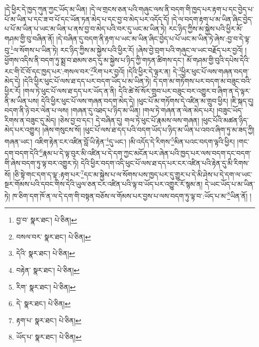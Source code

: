 །དེ་ཕྱིར་དེ་ཁྱད་ཀུན་ཀྱང་ཡོད་མ་ཡིན། །དེ་ལ་གྲངས་ཅན་པའི་གཞུང་ལས་ནི་བདག་གི་ཁྱད་པར་རྟག་པ་དང་བྱེད་པ་པོ་མ་ཡིན་པ་དང་ཟ་བ་པོ་དང་ཡོན་ཏན་མེད་པ་དང་བྱ་བ་མེད་པར་འདོད་དོ། །དེ་ལ་བདག་རྟག་པ་མ་ཡིན་ཞིང་བྱེད་པ་པོ་མ་ཡིན་པ་ཡང་མ་ཡིན་པ་ནས་བྱ་བ་མེད་པའི་བར་དུ་ཡང་མ་ཡིན་ཏེ། རང་ཉིད་ཀྱིས་མ་སྐྱེས་པའི་ཕྱིར་མོ་གཤམ་གྱི་བུ་བཞིན་ནོ། །དེ་བཞིན་དུ་བདག་ནི་རྟག་པ་ཡང་མ་ཡིན་ཞིང་བྱེད་པ་པོ་ཡང་མ་ཡིན་ཏེ་ཞེས་:བྱ་བ་དེ་ལྟ་བུ་\footnote{བྱ་བ་  སྣར་ཐང་།  པེ་ཅིན། }ལ་སོགས་པ་ཡིན་ཏེ། རང་ཉིད་ཀྱིས་མ་སྐྱེས་པའི་ཕྱིར་རོ། །ཞེས་བྱེ་བྲག་པའི་གཞུང་ལ་ཡང་བརྗོད་པར་བྱའོ། །ཕྱོགས་འདིས་ནི་བདག་ཏུ་སྨྲ་བ་ཐམས་ཅད་དུ་མ་སྐྱེས་པ་ཉིད་ཀྱི་གཏན་ཚིགས་དང་། མོ་གཤམ་གྱི་བུའི་དཔེས་དེའི་རང་གི་ངོ་བོ་དང་ཁྱད་པར་:གསལ་བར་\footnote{བསལ་བར་  སྣར་ཐང་།  པེ་ཅིན། }རིག་པར་བྱའོ། །དེའི་ཕྱིར་དེ་ལྟར་ན། དེ་\footnote{དེའི་  སྣར་ཐང་།  པེ་ཅིན། }ཕྱིར་ཕུང་པོ་ལས་གཞན་བདག་མེད་དེ། །དེའི་ཕྱིར་ཕུང་པོ་ལས་ཐ་དད་པར་བདག་ཡོད་པ་མ་ཡིན་ཏེ། དེ་དག་མ་གཏོགས་པར་བདག་མ་བཟུང་བའི་ཕྱིར་རོ། །གལ་ཏེ་ཕུང་པོ་ལས་ཐ་དད་པར་ཡོད་ན་ནི། དེའི་ཚེ་སོ་སོར་གྲུབ་པར་བཟུང་བར་འགྱུར་བ་ཞིག་ན་དེ་ལྟར་ནི་མ་ཡིན་པས། དེའི་ཕྱིར་ཕུང་པོ་ལས་གཞན་བདག་མེད་དེ། །ཕུང་པོ་མ་གཏོགས་དེ་འཛིན་མ་གྲུབ་ཕྱིར། །ཇི་སྐད་དུ། བདག་ནི་ཉེ་བར་ལེན་པ་ལས། །གཞན་དུ་འཐད་པ་ཉིད་མ་ཡིན། །གལ་ཏེ་གཞན་ན་ལེན་མེད་པར། །བཟུང་ཡོད་རིགས་ན་བཟུང་དུ་མེད། །ཅེས་བྱ་བ་དང་། དེ་བཞིན་དུ། གལ་ཏེ་ཕུང་པོ་རྣམས་ལས་གཞན། །ཕུང་པོའི་མཚན་ཉིད་མེད་པར་འགྱུར། །ཞེས་གསུངས་སོ། །ཕུང་པོ་ལས་ཐ་དད་པའི་བདག་ཡོད་པ་ཉིད་མ་ཡིན་པ་འབའ་ཞིག་ཏུ་མ་ཟད་ཀྱི། གཞན་ཡང་། འཇིག་རྟེན་ངར་འཛིན་བློ་ཡི་རྟེན་\footnote{བརྟེན་  སྣར་ཐང་།  པེ་ཅིན། }དུ་ཡང་། །མི་འདོད་དེ་རིགས་\footnote{རིག་  སྣར་ཐང་།  པེ་ཅིན། }མིན་པའང་བདག་ལྟའི་ཕྱིར། །གང་དག་བདག་དེའི་\footnote{དེ་  སྣར་ཐང་།  པེ་ཅིན། }རྣམ་པ་དེ་ལྟ་བུར་མི་འཛིན་པ་དེ་དག་ཀྱང་མངོན་པར་ཞེན་པའི་ཁྱད་པར་ལས་བདག་དང་བདག་གི་ཞེས་བདག་ཏུ་ལྟ་བར་འགྱུར་ཏེ། དེའི་ཕྱིར་བདག་འདི་ཕུང་པོ་ལས་ཐ་དད་པར་ངར་འཛིན་པའི་རྟེན་དུ་མི་རིགས་སོ། །ཅི་སྟེ་གང་དག་ད་ལྟ་:རྟག་པར་\footnote{རྟག་པ་  སྣར་ཐང་།  པེ་ཅིན། }དང་མ་སྐྱེས་པ་ལ་སོགས་པས་ཁྱད་པར་དུ་གྱུར་པ་དེ་མི་ཤེས་པ་དེ་དག་ལ་ཡང་སྔར་གོམས་པའི་དབང་གིས་དེའི་ཡུལ་ཅན་ངར་འཛིན་པའི་ལྟ་བ་ཡོད་པར་འགྱུར་རོ་སྙམ་ན། དེ་ཡང་ཡོད་པ་མ་ཡིན་ཏེ། ཁ་ཅིག་དག་ཁོ་ན་ལ་དེ་དག་གི་བསྟན་བཅོས་ལ་གོམས་པར་བྱས་པ་ལས་བདག་ཏུ་ལྟ་བ་:ཡོད་པ་མ་\footnote{ཡོད་པ་  སྣར་ཐང་།  པེ་ཅིན། }ཡིན་ནོ། །
